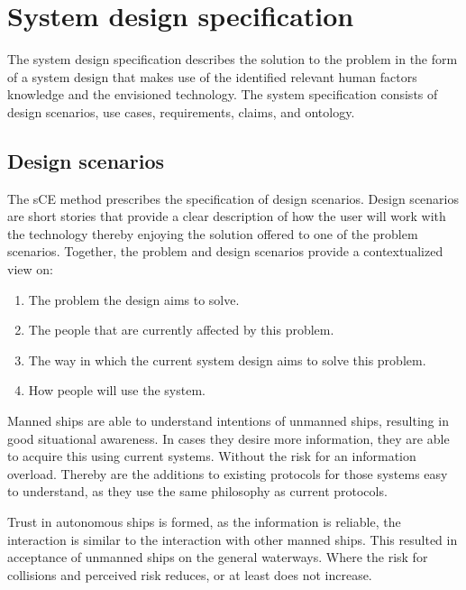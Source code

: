 \chapter{System design specification}
The system design specification describes the solution to the problem in the form of a system design that makes use of the identified relevant human factors knowledge and the envisioned technology. The system specification consists of design scenarios, use cases, requirements, claims, and ontology.

\section{Design scenarios}
The sCE method prescribes the specification of design scenarios. Design scenarios are short stories that provide a clear description of how the user will work with the technology thereby enjoying the solution offered to one of the problem scenarios. Together, the problem and design scenarios provide a contextualized view on:
\begin{enumerate}
	\item The problem the design aims to solve.
	\item The people that are currently affected by this problem.
	\item The way in which the current system design aims to solve this problem.
	\item How people will use the system.
\end{enumerate}

Manned ships are able to understand intentions of unmanned ships, resulting in good situational awareness. In cases they desire more information, they are able to acquire this using current systems. Without the risk for an information overload. Thereby are the additions to existing protocols for those systems easy to understand, as they use the same philosophy as current protocols.

Trust in autonomous ships is formed, as the information is reliable, the interaction is similar to the interaction with other manned ships. This resulted in acceptance of unmanned ships on the general waterways. Where the risk for collisions and perceived risk reduces, or at least does not increase.

